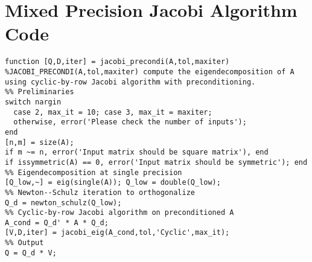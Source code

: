 \section{Mixed Precision Jacobi Algorithm Code}\label{app:mixed-precision-jacobi}
\begin{lstlisting}
function [Q,D,iter] = jacobi_precondi(A,tol,maxiter)
%JACOBI_PRECONDI(A,tol,maxiter) compute the eigendecomposition of A using cyclic-by-row Jacobi algorithm with preconditioning.
%% Preliminaries
switch nargin
  case 2, max_it = 10; case 3, max_it = maxiter;
  otherwise, error('Please check the number of inputs');
end
[n,m] = size(A); 
if m ~= n, error('Input matrix should be square matrix'), end
if issymmetric(A) == 0, error('Input matrix should be symmetric'); end
%% Eigendecomposition at single precision
[Q_low,~] = eig(single(A)); Q_low = double(Q_low);
%% Newton--Schulz iteration to orthogonalize
Q_d = newton_schulz(Q_low);
%% Cyclic-by-row Jacobi algorithm on preconditioned A
A_cond = Q_d' * A * Q_d;
[V,D,iter] = jacobi_eig(A_cond,tol,'Cyclic',max_it);
%% Output
Q = Q_d * V;
\end{lstlisting}



